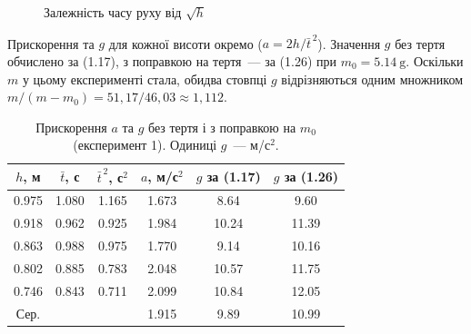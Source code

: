 \documentclass[ukrainian]{ucaphyslab}
\begin{document}
\begin{figure}[H]
  \centering
  \caption{Залежність часу руху від $\sqrt h$}
\end{figure}

Прискорення та $g$ для кожної висоти окремо ($a = 2h/\bar t^{\,2}$).
Значення $g$ без тертя обчислено за (1.17), з поправкою на тертя~--- за (1.26)
при $m_0 = \SI{5.14}{\gram}$. Оскільки $m$ у цьому експерименті стала,
обидва стовпці $g$ відрізняються одним множником
$m/(m-m_0) = 51{,}17/46{,}03 \approx 1{,}112$.

\begin{table}[H]
  \centering
  \begin{tabular}{@{}cccccc@{}}
    \toprule
    $h$, м & $\bar t$, с & $\bar t^{\,2}$, с$^2$ & $a$, м/с$^2$ & $g$ за (1.17) & $g$ за (1.26) \\
    \midrule
    0.975 & 1.080 & 1.165 & 1.673 & 8.64 & 9.60 \\
    0.918 & 0.962 & 0.925 & 1.984 & 10.24 & 11.39 \\
    0.863 & 0.988 & 0.975 & 1.770 & 9.14 & 10.16 \\
    0.802 & 0.885 & 0.783 & 2.048 & 10.57 & 11.75 \\
    0.746 & 0.843 & 0.711 & 2.099 & 10.84 & 12.05 \\
    \midrule
    Сер. & & & 1.915 & 9.89 & 10.99 \\
    \bottomrule
  \end{tabular}
  \caption{Прискорення $a$ та $g$ без тертя і з поправкою на $m_0$ (експеримент 1).
  Одиниці $g$~--- м/с$^2$.}
\end{table}
\end{document}
